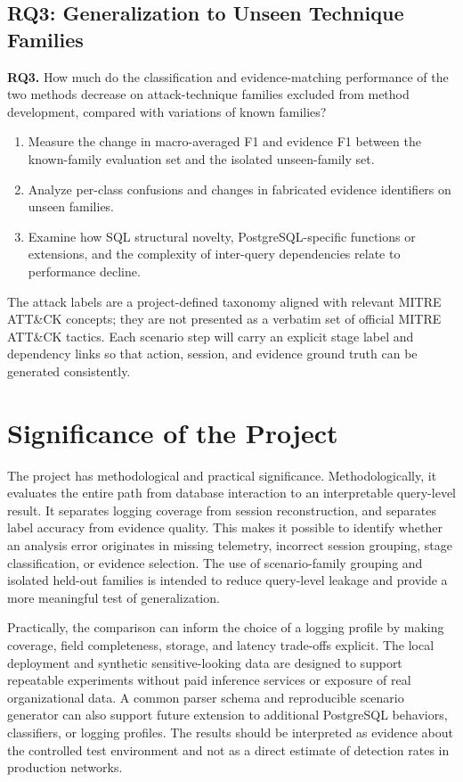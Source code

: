 \documentclass[12pt,a4paper]{report}
\begin{document}
\subsection{RQ3: Generalization to Unseen Technique Families}
\textbf{RQ3.} How much do the classification and evidence-matching performance of the two methods decrease on attack-technique families excluded from method development, compared with variations of known families?
\begin{enumerate}[label=\textbf{RO3.\arabic*:}]
    \item Measure the change in macro-averaged F1 and evidence F1 between the known-family evaluation set and the isolated unseen-family set.
    \item Analyze per-class confusions and changes in fabricated evidence identifiers on unseen families.
    \item Examine how SQL structural novelty, PostgreSQL-specific functions or extensions, and the complexity of inter-query dependencies relate to performance decline.
\end{enumerate}

The attack labels are a project-defined taxonomy aligned with relevant MITRE ATT\&CK concepts; they are not presented as a verbatim set of official MITRE ATT\&CK tactics. Each scenario step will carry an explicit stage label and dependency links so that action, session, and evidence ground truth can be generated consistently.

\section{Significance of the Project}
The project has methodological and practical significance. Methodologically, it evaluates the entire path from database interaction to an interpretable query-level result. It separates logging coverage from session reconstruction, and separates label accuracy from evidence quality. This makes it possible to identify whether an analysis error originates in missing telemetry, incorrect session grouping, stage classification, or evidence selection. The use of scenario-family grouping and isolated held-out families is intended to reduce query-level leakage and provide a more meaningful test of generalization.

Practically, the comparison can inform the choice of a logging profile by making coverage, field completeness, storage, and latency trade-offs explicit. The local deployment and synthetic sensitive-looking data are designed to support repeatable experiments without paid inference services or exposure of real organizational data. A common parser schema and reproducible scenario generator can also support future extension to additional PostgreSQL behaviors, classifiers, or logging profiles. The results should be interpreted as evidence about the controlled test environment and not as a direct estimate of detection rates in production networks.
\end{document}
